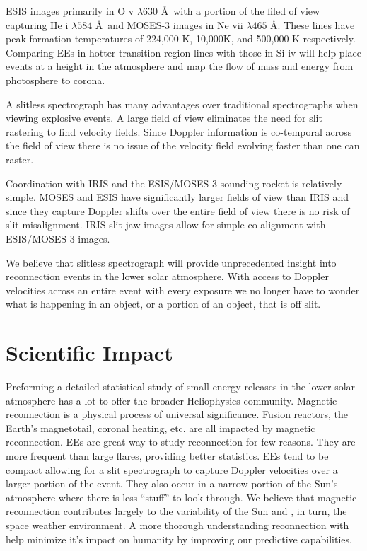\documentclass[]{aastex6}
\begin{document}
	ESIS images primarily in O {\sc v} $\lambda 630$ \AA \ with a portion of the filed of view capturing He {\sc i} $\lambda 584$ \AA \ and MOSES-3 images in Ne {\sc vii} $\lambda 465$ \AA.  These lines have peak formation temperatures of 224,000 K, 10,000K, and 500,000 K respectively. Comparing EEs in hotter transition region lines with those in Si {\sc iv} will help place events at a height in the atmosphere and map the flow of mass and energy from photosphere to corona.
	
	A slitless spectrograph has many advantages over traditional spectrographs when viewing explosive events.  A large field of view eliminates the need for slit rastering to find velocity fields.  Since Doppler information is co-temporal across the field of view there is no issue of the velocity field evolving faster than one can raster. 
	
	Coordination with IRIS and the ESIS/MOSES-3 sounding rocket is relatively simple. MOSES and ESIS have significantly larger fields of view than IRIS and since they capture Doppler shifts over the entire field of view there is no risk of slit misalignment.  IRIS slit jaw images allow for simple co-alignment with ESIS/MOSES-3 images.
	
	We believe that slitless spectrograph will provide unprecedented insight into reconnection events in the lower solar atmosphere. With access to Doppler velocities across an entire event with every exposure we no longer have to wonder what is happening in an object, or a portion of an object, that is off slit.


\section{Scientific Impact}
%
Preforming a detailed statistical study of small energy releases in the lower solar atmosphere has a lot to offer the broader Heliophysics community. Magnetic reconnection is a physical process of universal significance. Fusion reactors, the Earth's magnetotail, coronal heating, etc. are all impacted by magnetic reconnection. EEs are great way to study reconnection for few reasons. They are more frequent than large flares, providing better statistics.  EEs tend to be compact allowing for a slit spectrograph to capture Doppler velocities over a larger portion of the event.  They also occur in a narrow portion of the Sun's atmosphere where there is less ``stuff'' to look through.  We believe that magnetic reconnection contributes largely to the variability of the Sun and , in turn, the space weather environment.  A more thorough understanding reconnection with help minimize it's impact on humanity by improving our predictive capabilities.
\end{document}
